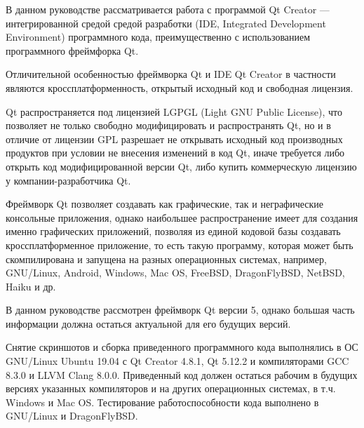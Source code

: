 
В данном руководстве рассматривается работа с программой Qt Creator — интегрированной средой средой разработки (IDE, Integrated Development Environment) программного кода, преимущественно с использованием программного фреймфорка Qt.

Отличительной особенностью фреймворка Qt и IDE Qt Creator в частности являются кроссплатформенность, открытый исходный код и свободная лицензия.

Qt распространяется под лицензией LGPGL (Light GNU Public License), что позволяет не только свободно модифицировать и распространять Qt, но и в отличие от лицензии GPL разрешает не открывать исходный код производных продуктов при условии не внесения изменений в код Qt, иначе требуется либо открыть код модифицированной версии Qt, либо купить коммерческую лицензию у компании-разработчика Qt.

Фреймворк Qt позволяет создавать как графические, так и неграфические консольные приложения, однако наибольшее распространение имеет для создания именно графических приложений, позволяя из единой кодовой базы создавать кроссплатформенное приложение, то есть такую программу, которая может быть скомпилирована и запущена на разных операционных системах, например, GNU/Linux, Android, Windows, Mac OS, FreeBSD, DragonFlyBSD, NetBSD, Haiku и др.

В данном руководстве рассмотрен фреймворк Qt версии 5, однако большая часть информации должна остаться актуальной для его будущих версий.

Снятие скриншотов и сборка приведенного программного кода выполнялись в ОС GNU/Linux Ubuntu 19.04 с Qt Creator 4.8.1, Qt 5.12.2 и компиляторами GCC 8.3.0 и LLVM Clang 8.0.0. Приведенный код должен остаться рабочим в будущих версиях указанных компиляторов и на других операционных системах, в т.ч. Windows и Mac OS. Тестирование работоспособности кода выполнено в GNU/Linux и DragonFlyBSD.

\clearpage
